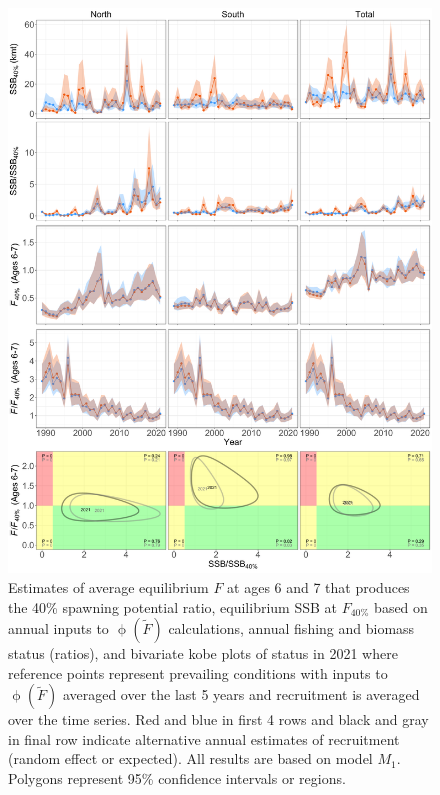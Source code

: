 \documentclass[
]{article}
\begin{document}
\begin{figure}

{\centering \includegraphics[height=0.85\textheight]{brp_status_results} 

}

\caption{Estimates of average equilibrium $F$ at ages 6 and 7 that produces the 40\% spawning potential ratio, equilibrium SSB at $F_{40\%}$ based on annual inputs to $\upphi(\widetilde{F})$ calculations, annual fishing and biomass status (ratios), and bivariate kobe plots of status in 2021 where reference points represent prevailing conditions with inputs to $\upphi(\widetilde{F})$ averaged over the last 5 years and recruitment is averaged over the time series. Red and blue in first 4 rows and black and gray in final row indicate alternative annual estimates of recruitment (random effect or expected). All results are based on model $M_1$. Polygons represent 95\% confidence intervals or regions.}\label{fig:annual-BRPs}
\end{figure}
\end{document}
